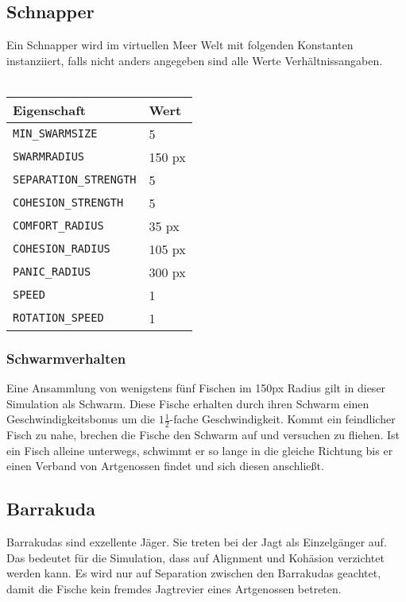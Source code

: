 \documentclass[11pt]{article}
\begin{document}
\subsection{Schnapper}
Ein Schnapper wird im virtuellen Meer Welt mit folgenden Konstanten instanziiert, falls nicht anders angegeben sind alle Werte Verhältnissangaben. \\\\
\begin{tabular}{|l|l|}
\hline
	\textbf{Eigenschaft} & \textbf{Wert}\\
\hline
\hline
	\lstinline[]$MIN_SWARMSIZE$  & 5\\
\hline
	\lstinline[]$SWARMRADIUS$ & 150 px\\
\hline
	\lstinline[]$SEPARATION_STRENGTH$ & 5\\
\hline
	\lstinline[]$COHESION_STRENGTH$ & 5\\
\hline
	\lstinline[]$COMFORT_RADIUS$ & 35 px\\
\hline
	\lstinline[]$COHESION_RADIUS$ & 105 px\\
\hline
	\lstinline[]$PANIC_RADIUS$ & 300 px\\
\hline
	\lstinline[]$SPEED$ & 1\\
\hline
	\lstinline[]$ROTATION_SPEED$ & 1\\
\hline
\end{tabular}

\subsubsection{Schwarmverhalten}
Eine Ansammlung von wenigstens fünf Fischen im 150px Radius gilt in dieser Simulation als Schwarm. Diese Fische erhalten durch ihren Schwarm einen Geschwindigkeitsbonus um die \( 1 \frac{1}{2} \)-fache Geschwindigkeit.
Kommt ein feindlicher Fisch zu nahe, brechen die Fische den Schwarm auf und versuchen zu fliehen. Ist ein Fisch alleine unterwegs, schwimmt er so lange in die gleiche Richtung bis er einen Verband von Artgenossen findet und sich diesen anschließt.

\subsection{Barrakuda}
Barrakudas sind exzellente Jäger. Sie treten bei der Jagt als Einzelgänger auf. Das bedeutet für die Simulation, dass auf Alignment und Kohäsion verzichtet werden kann. Es wird nur auf Separation zwischen den Barrakudas geachtet, damit die Fische kein fremdes Jagtrevier eines Artgenossen betreten.\\
\end{document}
